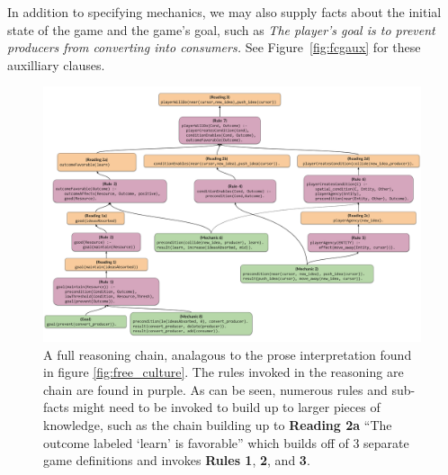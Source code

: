 \documentclass[12pt]{report}
\begin{document}
In addition to specifying mechanics, we may also supply facts about the
initial state of the game and the game's goal, such as {\em The player's
goal is to prevent producers from converting into consumers.}
See Figure~\ref{fig:fcgaux} for these auxilliary clauses.
\begin{figure}[h]
\centering
\includegraphics[width=0.99\textwidth]{figures/-Proceduralist_Reading_-_CODE.pdf}%
\caption{A full reasoning chain, analagous to the prose interpretation found in figure \ref{fig:free_culture}.  The rules invoked in the reasoning are chain are found in purple.  As can be seen, numerous rules and sub-facts might need to be invoked to build up to larger pieces of knowledge, such as the chain building up to \textbf{Reading 2a} ``The outcome labeled `learn' is favorable'' which builds off of 3 separate game definitions and invokes \textbf{Rules 1}, \textbf{2}, and \textbf{3}.}
\label{fig:proc_reading_code}
\end{figure}




\end{document}
